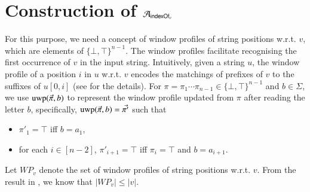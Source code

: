 %
\section{Construction of $\mathcal{A}_{\mathsf{indexOf}_v}$} \label{appendix:cefa_indexof}

For this purpose, we need a concept of window profiles of  string positions w.r.t. $v$, which are elements of $\{\bot, \top\}^{n-1}$. The window profiles facilitate recognising the first occurrence of $v$ in the input string. 
Intuitively, given a string $u$, the window profile of a position $i$ in $u$ w.r.t. $v$ encodes the matchings of prefixes of $v$ to the suffixes of $u[0,i]$ (see \cite{CCH+18} for the details). For $\pi = \pi_1 \cdots \pi_{n-1} \in \{\bot, \top\}^{n-1}$ and $b \in \Sigma$, we use ${\rm uwp}(\vec{\pi}, b)$ to represent the window profile updated from $\pi$ after reading the letter $b$, specifically, ${\rm uwp}(\vec{\pi}, b) = \vec{\pi'}$ such that  
\begin{itemize}
\item $\pi'_1 = \top$ iff $b = a_1$, 
%
\item for each $i \in [n-2]$, $\pi'_{i+1} = \top$ iff $\pi_{i} = \top$ and $b = a_{i+1}$. 
\end{itemize}
Let $WP_v$ denote the set of window profiles of string positions w.r.t. $v$. From the result in \cite{CCH+18}, we know that $|WP_v| \le |v|$. 
%
%

